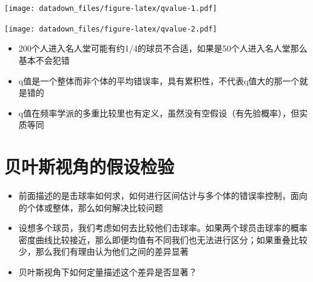 \documentclass[]{book}
\newenvironment{Shaded}{\begin{snugshade}}{\end{snugshade}}
\newcommand{\CommentTok}[1]{\textcolor[rgb]{0.56,0.35,0.01}{\textit{#1}}}
\newcommand{\FloatTok}[1]{\textcolor[rgb]{0.00,0.00,0.81}{#1}}
\newcommand{\KeywordTok}[1]{\textcolor[rgb]{0.13,0.29,0.53}{\textbf{#1}}}
\newcommand{\NormalTok}[1]{#1}
\newcommand{\OperatorTok}[1]{\textcolor[rgb]{0.81,0.36,0.00}{\textbf{#1}}}
\newcommand{\StringTok}[1]{\textcolor[rgb]{0.31,0.60,0.02}{#1}}
\begin{document}
\texttt{[image: datadown\_files/figure-latex/qvalue-1.pdf]}

\begin{Shaded}
\end{Shaded}

\texttt{[image: datadown\_files/figure-latex/qvalue-2.pdf]}

\begin{itemize}
\item
  200个人进入名人堂可能有约1/4的球员不合适，如果是50个人进入名人堂那么基本不会犯错
\item
  q值是一个整体而非个体的平均错误率，具有累积性，不代表q值大的那一个就是错的
\item
  q值在频率学派的多重比较里也有定义，虽然没有空假设（有先验概率），但实质等同
\end{itemize}

\hypertarget{ux8d1dux53f6ux65afux89c6ux89d2ux7684ux5047ux8bbeux68c0ux9a8c}{%
\section{贝叶斯视角的假设检验}\label{ux8d1dux53f6ux65afux89c6ux89d2ux7684ux5047ux8bbeux68c0ux9a8c}}

\begin{itemize}
\item
  前面描述的是击球率如何求，如何进行区间估计与多个体的错误率控制，面向的个体或整体，那么如何解决比较问题
\item
  设想多个球员，我们考虑如何去比较他们击球率。如果两个球员击球率的概率密度曲线比较接近，那么即便均值有不同我们也无法进行区分；如果重叠比较少，那么我们有理由认为他们之间的差异显著
\item
  贝叶斯视角下如何定量描述这个差异是否显著？
\end{itemize}
\end{document}

